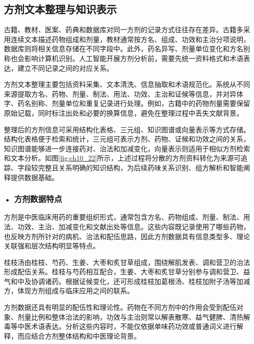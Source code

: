 \subsection{方剂文本整理与知识表示}

古籍、教材、医案、药典和数据库对同一方剂的记录方式往往存在差异。古籍多采用连续文本描述药物组成和剂量，教材通常按方名、组成、功效和主治分项说明，数据库则将相关信息存储在不同字段中。此外，药名异写、剂量单位变化和方名别称也会影响计算机识别。人工智能开展方剂分析前，需要先统一资料格式和术语表达，建立不同记录之间的对应关系。

方剂文本整理主要包括资料采集、文本清洗、信息抽取和术语规范化。系统从不同来源提取方名、药物、剂量、制法、用法、功效、主治和证候等信息，并对异体字、药名别称、剂量单位和重复记录进行处理。例如，古籍中的药物剂量需要保留原始记载，同时标注出处和必要的换算信息，避免在整理过程中丢失文献背景。

整理后的方剂信息可采用结构化表格、三元组、知识图谱或向量表示等方式存储。结构化表格便于检索和统计，三元组可表示方剂、药物、证候和功效之间的关系，知识图谱能够进一步连接药对、治法和加减变化，向量表示则适用于相似方剂检索和文本分析。如图\ref{fig:ch10_22}所示，上述过程将分散的方剂资料转化为来源可追踪、字段较完整且关系明确的知识结构，为后续药味关系识别、组方解析和智能阐释提供数据基础。


\par
\noindent\begin{minipage}{\textwidth}
\centering
{}
\label{fig:ch10_22}
\end{minipage}
\par

\subsubsection*{\textbf{• 方剂数据特点}}

方剂是中医临床用药的重要组织形式，通常包含方名、药物组成、剂量、制法、用法、功效、主治、加减变化和文献出处等信息。这些内容既记录使用了哪些药物，也反映方剂所针对的病机、治法和配伍思路，因此方剂数据具有信息类型多、理论关联强和层次结构明显等特点。

桂枝汤由桂枝、芍药、生姜、大枣和炙甘草组成，围绕解肌发表、调和营卫的治法形成配伍关系。桂枝与芍药相互配合，生姜、大枣和炙甘草分别参与调和营卫、益气和中及协调诸药。根据证候变化，还可形成桂枝加葛根汤、桂枝加附子汤等加减方，体现方剂组成与临床应用之间的联系。

方剂数据还具有明显的配伍性和理论性。药物在不同方剂中的作用会受到配伍对象、剂量比例和整体治法的影响，功效与主治则常以解表散寒、益气健脾、清热解毒等中医术语表达。分析这些内容时，不能仅依据单味药功效或普通词义进行解释，而应结合方剂整体结构和中医理论背景。

